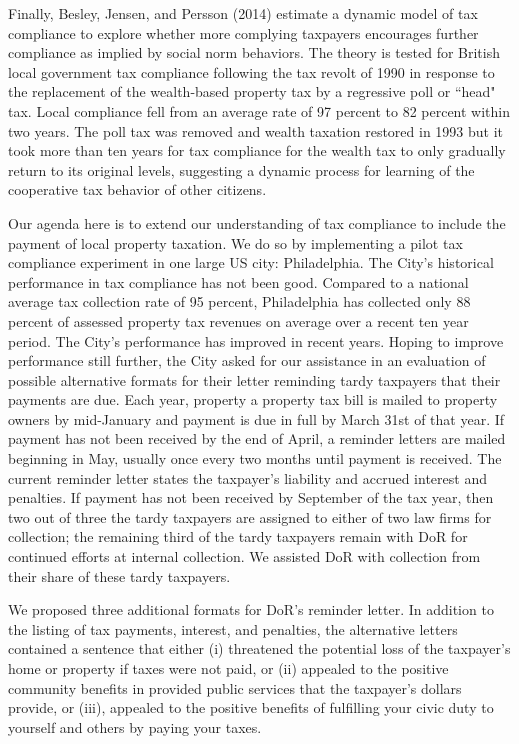 \documentclass[12pt,titlepage]{article}
\begin{document}
Finally, Besley, Jensen, and Persson (2014) estimate a dynamic model
of tax compliance to explore whether more complying taxpayers
encourages further compliance as implied by social norm behaviors.
The theory is tested for British local government tax compliance
following the tax revolt of 1990 in response to the replacement of the
wealth-based property tax by a regressive poll or ``head" tax.  Local
compliance fell from an average rate of 97 percent to 82 percent
within two years.  The poll tax was removed and wealth taxation
restored in 1993 but it took more than ten years for tax compliance
for the wealth tax to only gradually return to its original levels,
suggesting a dynamic process for learning of the cooperative tax
behavior of other citizens.

Our agenda here is to extend our understanding of tax compliance to
include the payment of local property taxation.  We do so by
implementing a pilot tax compliance experiment in one large US city:
Philadelphia.  The City's historical performance in tax compliance has
not been good.  Compared to a national average tax collection rate of
95 percent, Philadelphia has collected only 88 percent of assessed
property tax revenues on average over a recent ten year period.  The
City's performance has improved in recent years.  Hoping to improve
performance still further, the City asked for our assistance in an
evaluation of possible alternative formats for their letter reminding
tardy taxpayers that their payments are due. Each year, property a 
property tax bill is mailed to property owners by mid-January and 
payment is due in full by March 31st of that year.  If payment has 
not been received by the end of April, a reminder letters are mailed 
beginning in May, usually once every two months until payment is 
received.  The current reminder letter states the taxpayer’s liability 
and accrued interest and penalties.  If payment has not been received 
by September of the tax year, then two out of three the tardy taxpayers 
are assigned to either of two law firms for collection; the remaining 
third of the tardy taxpayers remain with DoR for continued efforts at 
internal collection.  We assisted DoR with collection from their 
share of these tardy taxpayers. 

We proposed three additional
formats for DoR's reminder letter.  In addition to the listing of tax
payments, interest, and penalties, the alternative letters contained a
sentence that either (i) threatened the potential loss of the
taxpayer's home or property if taxes were not paid, or (ii) appealed
to the positive community benefits in provided public services that
the taxpayer's dollars provide, or (iii), appealed to the positive
benefits of fulfilling your civic duty to yourself and others by
paying your taxes.
\end{document}
